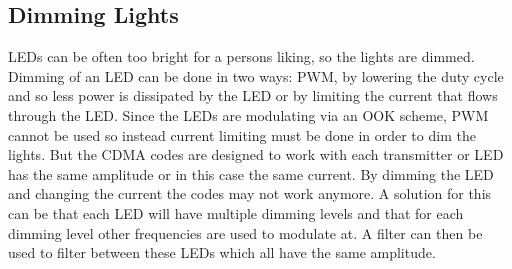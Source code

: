 \subsection{Dimming Lights}

LEDs can be often too bright for a persons liking, so the lights are dimmed.
Dimming of an LED can be done in two ways: PWM, by lowering the duty cycle and so less power is dissipated by the LED or by limiting the current that flows through the LED.
Since the LEDs are modulating via an OOK scheme, PWM cannot be used so instead current limiting must be done in order to dim the lights.
But the CDMA codes are designed to work with each transmitter or LED has the same amplitude or in this case the same current.
By dimming the LED and changing the current the codes may not work anymore.
A solution for this can be that each LED will have multiple dimming levels and that for each dimming level other frequencies are used to modulate at.
A filter can then be used to filter between these LEDs which all have the same amplitude.









